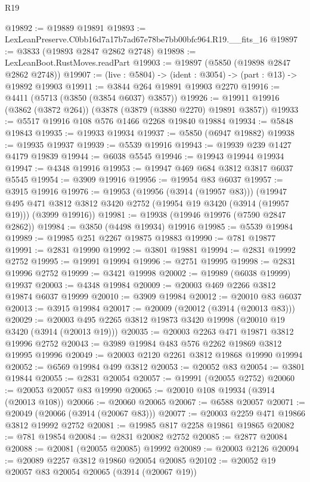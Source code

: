 \begin{lexlean}{R19}
\begin{coremodule}
@19892 := @19889 @19891
@19893 := LexLeanPreserve.C0bb16d7a17b7ad67e78be7bb00bfc964.R19.__fits_16
@19897 := @3833 (@19893 @2847 @2862 @2748)
@19898 := LexLeanBoot.RustMoves.readPart
@19903 := @19897 (@5850 (@19898 @2847 @2862 @2748))
@19907 := (live : @5804) -> (ident : @3054) -> (part : @13) -> @19892 @19903
@19911 := @3844 @264 @19891 @19903 @2270
@19916 := @4411 (@5713 (@3850 (@3854 @6037) @3857))
@19926 := @19911 @19916 (@3862 (@3872 @264)) (@3878 (@3879 (@3880 @2270) @19891 @3857))
@19933 := @5517 @19916 @108 @576 @1466 @2268 @19840 @19884
@19934 := @5848 @19843
@19935 := @19933 @19934
@19937 := @5850 (@6947 @19882)
@19938 := @19935 @19937
@19939 := @5539 @19916
@19943 := @19939 @239 @1427 @4179 @19839
@19944 := @6038 @5545
@19946 := @19943 @19944 @19934
@19947 := @4348 @19916
@19953 := @19947 @469 @684 @3812 @3817 @6037 @5545
@19954 := @3909 @19916
@19956 := @19954 @83 @6037
@19957 := @3915 @19916
@19976 := @19953
    (@19956 (@3914 (@19957 @83)))
    (@19947
      @495
      @471
      @3812
      @3812
      @3420
      @2752
      (@19954 @19 @3420 (@3914 (@19957 @19)))
      (@3999 @19916))
@19981 := @19938 (@19946 @19976 (@7590 @2847 @2862))
@19984 := @3850 (@4498 @19934) @19916
@19985 := @5539 @19984
@19989 := @19985 @251 @2267 @19875 @19883
@19990 := @781 @19877
@19991 := @2831 @19990
@19992 := @3801 @19881
@19994 := @2831 @19992 @2752
@19995 := @19991 @19994
@19996 := @2751 @19995
@19998 := @2831 @19996 @2752
@19999 := @3421 @19998
@20002 := @19989 (@6038 @19999) @19937
@20003 := @4348 @19984
@20009 := @20003 @469 @2266 @3812 @19874 @6037 @19999
@20010 := @3909 @19984
@20012 := @20010 @83 @6037
@20013 := @3915 @19984
@20017 := @20009 (@20012 (@3914 (@20013 @83)))
@20029 := @20003 @495 @2265 @3812 @19873 @3420 @19998 (@20010 @19 @3420 (@3914 (@20013 @19)))
@20035 := @20003 @2263 @471 @19871 @3812 @19996 @2752
@20043 := @3989 @19984 @483 @576 @2262 @19869 @3812 @19995 @19996
@20049 := @20003 @2120 @2261 @3812 @19868 @19990 @19994
@20052 := @6569 @19984 @499 @3812
@20053 := @20052 @83
@20054 := @3801 @19844
@20055 := @2831 @20054
@20057 := @19991 (@20055 @2752)
@20060 := @20053 @20057 @83 @19990
@20065 := @20010 @108 @19934 (@3914 (@20013 @108))
@20066 := @20060 @20065
@20067 := @6588 @20057
@20071 := @20049 (@20066 (@3914 (@20067 @83)))
@20077 := @20003 @2259 @471 @19866 @3812 @19992 @2752
@20081 := @19985 @817 @2258 @19861 @19865
@20082 := @781 @19854
@20084 := @2831 @20082 @2752
@20085 := @2877 @20084
@20088 := @20081 (@20055 @20085) @19992
@20089 := @20003 @2126
@20094 := @20089 @2257 @3812 @19860 @20054 @20085
@20102 := @20052 @19 @20057 @83 @20054 @20065 (@3914 (@20067 @19))

\end{coremodule}
\end{lexlean}
